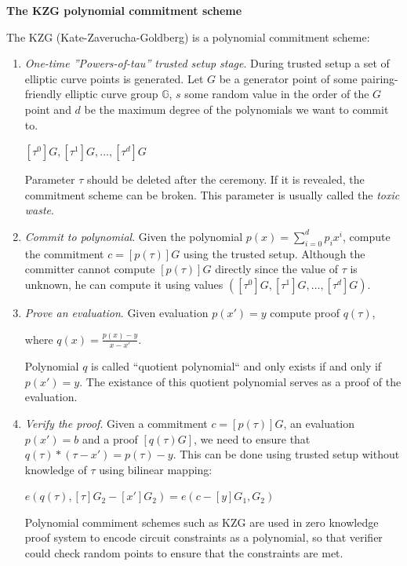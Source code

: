 \documentclass[../lecture-notes.tex]{subfiles}
\begin{document}
\textbf{The KZG polynomial commitment scheme}

\vspace{0.5 cm}


The KZG (Kate-Zaverucha-Goldberg) is a polynomial commitment scheme:


\begin{enumerate}
    \item \textit{One-time ''Powers-of-tau'' trusted setup stage}. During trusted setup a set of elliptic curve points is generated. Let $G$ be a generator point of some pairing-friendly
    elliptic curve group $\mathbb{G}$, $s$ some random value in the order of the $G$ point and $d$ be the maximum degree of the polynomials we want to commit to.

    \begin{center}
        $[\tau^0]G, [\tau^1]G, \ldots, [\tau^d]G$
    \end{center}

    Parameter $\tau$ should be deleted after the ceremony. If it is revealed, the commitment scheme can be broken. This parameter is usually called the \textit{toxic waste}.
    
    \item \textit{Commit to polynomial}. Given the polynomial $p(x) = \sum_{i = 0}^{d} p_i x^i$, compute the commitment $c = [p(\tau)]G $ 
    using the trusted setup. Although the committer cannot compute $[p(\tau)]G$ directly since the value of $\tau$ is unknown, he can
    compute it using values $([\tau^0]G, [\tau^1]G, \ldots, [\tau^d]G)$.
    
    \item \textit{Prove an evaluation}. Given evaluation $p(x') = y$ compute proof $q(\tau)$,
    
    where $q(x) = \frac{p(x) - y}{x - x'}$.

    Polynomial $q$ is called ``quotient polynomial`` and only exists if and only if $p(x') = y$. The existance of this quotient polynomial serves
    as a proof of the evaluation.

    \item \textit{Verify the proof}. Given a commitment $c = [p(\tau)]G$, an evaluation $p(x') = b$ and a proof $[q(\tau)G]$, we need to
    ensure that $q(\tau) * (\tau - x') = p(\tau) - y$. This can be done using trusted setup without knowledge of $\tau$ using bilinear mapping:

    \begin{center}
        $e(q(\tau), [\tau]G_2 - [x']G_2) = e(c - [y]G_1, G_2)$
    \end{center}
    
    Polynomial commiment schemes such as KZG are used in zero knowledge proof system to encode circuit constraints as a polynomial, 
    so that verifier could check random points to ensure that the constraints are met.

\end{enumerate}
\end{document}

